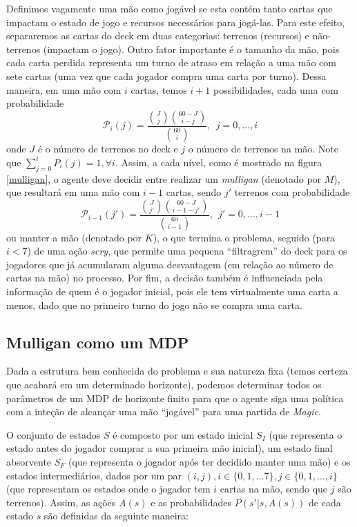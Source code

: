 Definimos vagamente uma mão como jogável se esta contém tanto cartas que
impactam o estado de jogo e recursos necessários para jogá-las.
Para este efeito, separaremos as cartas do deck em duas categorias:
terrenos (recursos) e não-terrenos (impactam o jogo).
Outro fator importante é o tamanho da mão, pois cada carta perdida
representa um turno de atraso em relação a uma mão com sete cartas (uma
vez que cada jogador compra
uma carta por turno). Dessa maneira, em uma mão com $i$ cartas, temos
$i+1$ possibilidades, cada uma com probabilidade
\begin{equation} \label{eq:stateprob} \mathcal{P}_i(j) =
\frac{\binom{J}{j}\binom{60 - J}{i - j}}{\binom{60}{i}}, \ \
j = 0,\ldots, i \end{equation} onde $J$ é o número de terrenos no deck
e $j$ o
número de terrenos
na mão. Note que $\sum_{j=0}^{i}P_i(j) = 1, \forall i$. Assim, a cada nível, como é mostrado na figura \ref{mulligan}, o
agente deve decidir entre realizar um \textit{mulligan}
(denotado por $M$), que resultará em uma mão com $i-1$ cartas, sendo $j'$
terrenos com probabilidade
 \[ \mathcal{P}_{i - 1}(j') = \frac{\binom{J}{j'}\binom{60 - J}{i - 1 -
j'}}{\binom{60}{i - 1}}, \ \  j' = 0,\ldots, i - 1\]
 ou manter a mão (denotado por $K$), o que termina o problema, seguido
(para $i < 7$) de uma ação \textit{scry}, que permite uma pequena
``filtragrem''
 do deck para os jogadores que já acumularam alguma desvantagem (em
relação ao número de cartas na mão) no processo. Por fim, a decisão
também é influenciada
 pela informação de quem é o jogador inicial, pois ele tem virtualmente
uma carta a menos, dado que no primeiro turno do jogo não se compra uma
carta.

\subsection{Mulligan como um MDP}

Dada a estrutura bem conhecida do problema e sua natureza fixa (temos certeza que acabará em um
determinado horizonte), podemos determinar todos os parâmetros de um MDP de horizonte finito para
que o agente siga uma política com a inteção de alcançar uma mão ``jogável'' para uma partida de
\textit{Magic}.

O conjunto de estados $S$ é composto por um estado inicial $S_I$ (que representa o estado antes
do jogador comprar a sua primeira mão inicial), um estado final absorvente $S_F$ (que representa
o jogador após ter decidido manter uma mão) e os estados intermediários, dados por um par $(i, j),
i \in \{ 0, 1, \ldots 7\}, j \in \{ 0, 1, \ldots, i \}$ (que representam os estados onde o jogador
tem $i$ cartas na mão, sendo que $j$ são terrenos). Assim, as ações $A(s)$ e as probabilidades
$P(s'|s, A(s))$ de cada estado $s$ são definidas da seguinte maneira:

